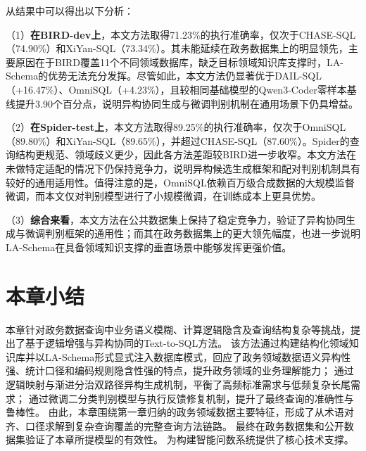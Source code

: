 从结果中可以得出以下分析：

（1）\textbf{在BIRD-dev上}，本文方法取得71.23\%的执行准确率，仅次于CHASE-SQL（74.90\%）和XiYan-SQL（73.34\%）。其未能延续在政务数据集上的明显领先，主要原因在于BIRD覆盖11个不同领域数据库，缺乏目标领域知识库支撑时，LA-Schema的优势无法充分发挥。尽管如此，本文方法仍显著优于DAIL-SQL（+16.47\%）、OmniSQL（+4.23\%），且较相同基础模型的Qwen3-Coder零样本基线提升3.90个百分点，说明异构协同生成与微调判别机制在通用场景下仍具增益。


（2）\textbf{在Spider-test上}，本文方法取得89.25\%的执行准确率，仅次于OmniSQL（89.80\%）和XiYan-SQL（89.65\%），并超过CHASE-SQL（87.60\%）。Spider的查询结构更规范、领域歧义更少，因此各方法差距较BIRD进一步收窄。本文方法在未做特定适配的情况下仍保持竞争力，说明异构候选生成框架和配对判别机制具有较好的通用适用性。值得注意的是，OmniSQL依赖百万级合成数据的大规模监督微调，而本文仅对判别模型进行了小规模微调，在训练成本上更具优势。

（3）\textbf{综合来看}，本文方法在公共数据集上保持了稳定竞争力，验证了异构协同生成与微调判别框架的通用性；而其在政务数据集上的更大领先幅度，也进一步说明LA-Schema在具备领域知识支撑的垂直场景中能够发挥更强价值。

\section{本章小结}

本章针对政务数据查询中业务语义模糊、计算逻辑隐含及查询结构复杂等挑战，提出了基于逻辑增强与异构协同的Text-to-SQL方法。
该方法通过构建结构化领域知识库并以LA-Schema形式显式注入数据库模式，回应了政务领域数据语义异构性强、统计口径和编码规则隐含性强的特点，提升政务领域的业务理解能力；
通过逻辑映射与渐进分治双路径异构生成机制，平衡了高频标准需求与低频复杂长尾需求；
通过微调二分类判别模型与执行反馈修复机制，提升了最终查询的准确性与鲁棒性。
由此，本章围绕第一章归纳的政务领域数据主要特征，形成了从术语对齐、口径求解到复杂查询覆盖的完整查询方法链路。
最终在政务数据集和公开数据集验证了本章所提模型的有效性。
为构建智能问数系统提供了核心技术支撑。
